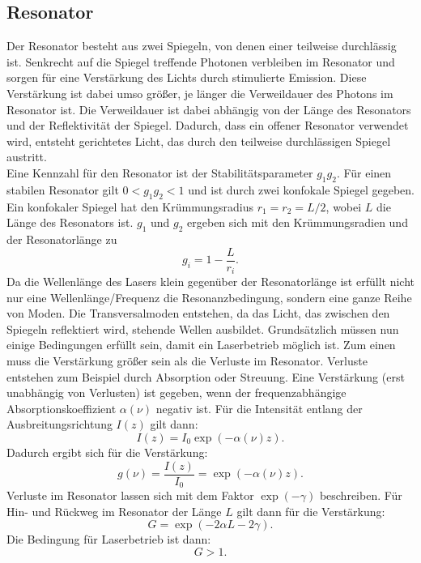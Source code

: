 \subsection{Resonator}\label{sec:resonator}
Der Resonator besteht aus zwei Spiegeln, von denen einer teilweise durchlässig ist. Senkrecht auf die Spiegel treffende Photonen verbleiben im Resonator und sorgen für 
eine Verstärkung des Lichts durch stimulierte Emission. Diese Verstärkung ist dabei umso größer, je länger die Verweildauer des Photons im Resonator ist.
Die Verweildauer ist dabei abhängig von der Länge des Resonators und der Reflektivität der Spiegel. Dadurch, dass ein offener Resonator verwendet wird, entsteht gerichtetes Licht, das durch den
teilweise durchlässigen Spiegel austritt.\\
Eine Kennzahl für den Resonator ist der Stabilitätsparameter $g_1 g_2$. Für einen stabilen Resonator gilt $0 < g_1 g_2 < 1$ und
ist durch zwei konfokale Spiegel gegeben. Ein konfokaler Spiegel hat den Krümmungsradius $r_1 = r_2 = L/2$, wobei $L$ die Länge des Resonators ist. $g_1$ und $g_2$ ergeben sich mit den
Krümmungsradien und der Resonatorlänge zu
\begin{equation*}
    g_i = 1 - \frac{L}{r_i}.
\end{equation*}
Da die Wellenlänge des Lasers klein gegenüber der Resonatorlänge ist erfüllt nicht nur eine Wellenlänge/Frequenz die Resonanzbedingung, sondern eine ganze Reihe von Moden. Die Transversalmoden
entstehen, da das Licht, das zwischen den Spiegeln reflektiert wird, stehende Wellen ausbildet. 
Grundsätzlich müssen nun einige Bedingungen erfüllt sein, damit ein Laserbetrieb möglich ist. Zum einen muss die Verstärkung größer sein als die Verluste im Resonator. Verluste entstehen
zum Beispiel durch Absorption oder Streuung. Eine Verstärkung (erst unabhängig von Verlusten) ist gegeben, wenn der frequenzabhängige Absorptionskoeffizient $\alpha(\nu)$ negativ ist.\cite{demtroeder}
Für die Intensität entlang der Ausbreitungsrichtung $I(z)$ gilt dann:
\begin{equation*}
    I(z) = I_0 \exp\left(-\alpha(\nu)z\right).
\end{equation*}
Dadurch ergibt sich für die Verstärkung:
\begin{equation*}
    g(\nu) = \frac{I(z)}{I_0} = \exp\left(-\alpha(\nu)z\right).
\end{equation*}
Verluste im Resonator lassen sich mit dem Faktor $\exp(-\gamma)$ beschreiben. Für Hin- und Rückweg im Resonator der Länge $L$ gilt dann für die Verstärkung:
\begin{equation*}
    G = \exp(-2\alpha L - 2\gamma).
\end{equation*}
Die Bedingung für Laserbetrieb ist dann:
\begin{equation*}
    G > 1.
\end{equation*}
